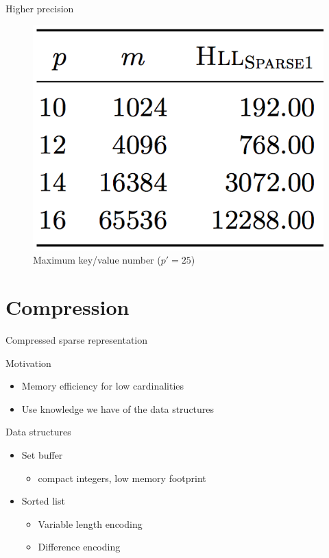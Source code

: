 \documentclass{beamer}
\begin{document}
\begin{frame}{Higher precision}

  \begin{figure}[c]
    \includegraphics [scale=0.45]  {sparse1.png}
    \caption{Maximum key/value number ($p' = 25$)}
  \end{figure}

\end{frame}



\section{Compression}
\begin{frame}{Compressed sparse representation}


  \begin{block}{Motivation}
    \begin{itemize}
      \item Memory efficiency for low cardinalities
      \item Use knowledge we have of the data structures
    \end{itemize}
  \end{block}


  \begin{block}{Data structures}
    \begin{itemize}
      \item Set buffer
        \begin{itemize}
        \item compact integers, low memory footprint
        \end{itemize}
      \item Sorted list
      \begin{itemize}
        \item Variable length encoding
        \item Difference encoding
      \end{itemize}
    \end{itemize}
  \end{block}


\end{frame}
\end{document}
